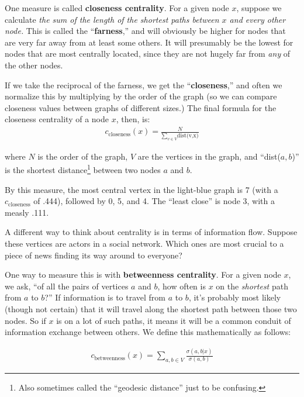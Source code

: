 \vspace{.2in}
One measure is called \textbf{closeness centrality}. For a given node $x$,
suppose we calculate \textit{the sum of the length of the shortest paths
between $x$ and every other node.} This is called the ``\textbf{farness},'' and
will obviously be higher for nodes that are very far away from at least some
others. It will presumably be the lowest for nodes that are most centrally
located, since they are not hugely far from \textit{any} of the other nodes.

If we take the reciprocal of the farness, we get the ``\textbf{closeness},''
and often we normalize this by multiplying by the order of the graph (so we
can compare closeness values between graphs of different sizes.) The final
formula for the closeness centrality of a node $x$, then, is:
\begin{align*}
c_{\textrm{closeness}}(x) = \frac{N}{\sum_{v \in V} \textrm{dist(v,x)}}
\end{align*}

where $N$ is the order of the graph, $V$ are the vertices in the graph, and
``dist($a,b$)'' is the shortest distance\footnote{Also sometimes called the
``geodesic distance'' just to be confusing.} between two nodes $a$ and $b$.

By this measure, the most central vertex in the light-blue graph is 7 (with a 
$c_{\textrm{closeness}}$ of .444), followed by 0, 5, and 4. The ``least
close''
is node 3, with a measly .111.

\vspace{.2in}

A different way to think about centrality is in terms of information flow.
Suppose these vertices are actors in a social network. Which ones are most
crucial to a piece of news finding its way around to everyone? 

One way to measure this is with \textbf{betweenness centrality}. For a given
node $x$, we ask, ``of all the pairs of vertices $a$ and $b$, how often is $x$
on the \textit{shortest} path from $a$ to $b$?'' If information is to travel
from $a$ to $b$, it's probably most likely (though not certain) that it will
travel along the shortest path between those two nodes. So if $x$ is on a lot
of such paths, it means it will be a common conduit of information exchange
between others. We define this mathematically as follows:

\begin{align*}
c_{\textrm{betweenness}}(x) = \sum_{a,b \in V} \frac{\sigma(a,b|x)}{\sigma(a,b)}
\end{align*}

